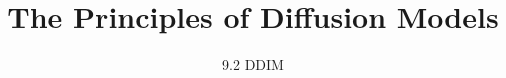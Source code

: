 ﻿%

\title{The Principles of Diffusion Models}
\subtitle{9.2 DDIM}


\begin{frame}
    \titlepage
\end{frame}


